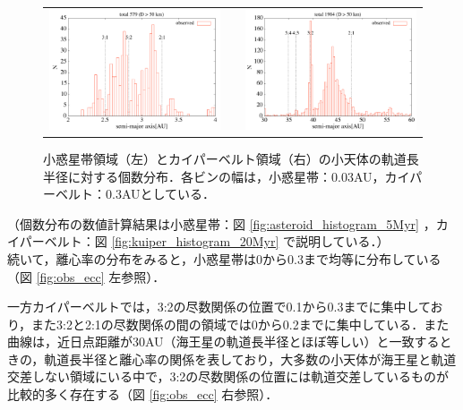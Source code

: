 \documentclass[11pt,a4paper,oneside,onecolumn]{jreport}
\begin{document}
\begin{figure}[H]
\begin{tabular}{ccc}
\begin{minipage}[t]{0.45\hsize}
\centering
\includegraphics[width=8cm]{./image/mainbelt_histogram.pdf}
\end{minipage} &
\begin{minipage}[t]{0.1\hsize}
\end{minipage} &
\begin{minipage}[t]{0.45\hsize}
\centering
\includegraphics[width=8cm]{./image/kuiperbelt_histogram.pdf}
\end{minipage}\\
%
\end{tabular}
\caption{小惑星帯領域（左）とカイパーベルト領域（右）の小天体の軌道長半径に対する個数分布．各ビンの幅は，小惑星帯：0.03AU，カイパーベルト：0.3AUとしている．\label{fig:obs_histogram}}
\end{figure}

（個数分布の数値計算結果は小惑星帯：図 \ref{fig:asteroid_histogram_5Myr} ，カイパーベルト：図 \ref{fig:kuiper_histogram_20Myr} で説明している．）
\\

続いて，離心率の分布をみると，小惑星帯は0から0.3まで均等に分布している（図 \ref{fig:obs_ecc} 左参照）．

一方カイパーベルトでは，3:2の尽数関係の位置で0.1から0.3までに集中しており，また3:2と2:1の尽数関係の間の領域では0から0.2までに集中している．また曲線は，近日点距離が30AU（海王星の軌道長半径とほぼ等しい）と一致するときの，軌道長半径と離心率の関係を表しており，大多数の小天体が海王星と軌道交差しない領域にいる中で，3:2の尽数関係の位置には軌道交差しているものが比較的多く存在する（図 \ref{fig:obs_ecc} 右参照）．
\end{document}
